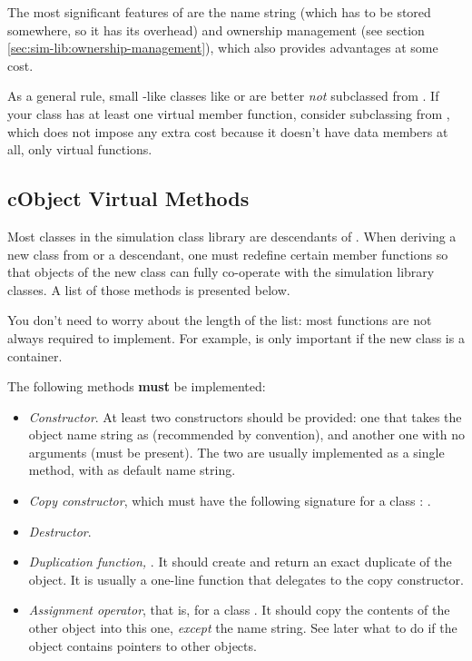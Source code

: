 The most significant features of  are
the name string (which has to be stored somewhere, so it has
its overhead) and ownership management (see section
\ref{sec:sim-lib:ownership-management}), which
also provides advantages at some cost.

As a general rule, small -like classes like  or
 are better \textit{not} subclassed from .
If your class has at least one virtual member function, consider
subclassing from , which does not impose any
extra cost because it doesn't have data members at all, only
virtual functions.


\subsection{cObject Virtual Methods}
\label{sec:sim-lib:cobject-virtual-methods}

Most classes in the simulation class library are descendants of
. When deriving a new class from 
or a  descendant, one must redefine certain member
functions so that objects of the new class can fully co-operate
with the simulation library classes. A list of those methods is
presented below.

\begin{note}
You don't need to worry about the length of the list: most functions
are not always required to implement. For example, 
is only important if the new class is a container.
\end{note}

The following methods \textbf{must} be implemented:

\begin{itemize}
  \item \textit{Constructor}. At least two constructors should be provided:
        one that takes the object name string as 
        (recommended by convention), and another one with no arguments
        (must be present). The two are usually implemented as a single
        method, with  as default name string.
  \item \textit{Copy constructor}, which must have the following signature
        for a class : .
  \item \textit{Destructor}.
  \item \textit{Duplication function,} .
        It should create and return an exact duplicate of the object.
        It is usually a one-line function that delegates to the copy constructor.
  \item \textit{Assignment operator}, that is, 
        for a class . It should copy the contents of the other
        object into this one, \textit{except} the name string. See later what to do
        if the object contains pointers to other objects.
\end{itemize}

